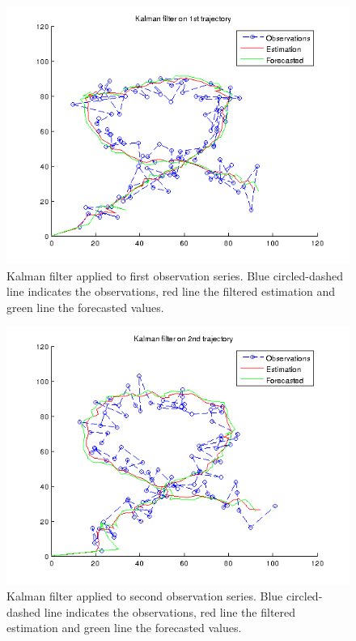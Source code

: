 \documentclass[a4paper, 12pt, titlepage]{article}
\begin{document}
\begin{figure}
	\includegraphics[width=15cm]{images/1trajectory.png}
	\caption{Kalman filter applied to first observation series. Blue circled-dashed line indicates the observations, red line the filtered estimation and green line the forecasted values.}
	\label{fig:1}
\end{figure}

\begin{figure}
	\includegraphics[width=15cm]{images/2trajectory.png}
	\caption{Kalman filter applied to second observation series. Blue circled-dashed line indicates the observations, red line the filtered estimation and green line the forecasted values.}
	\label{fig:2}
\end{figure}
\end{document}
